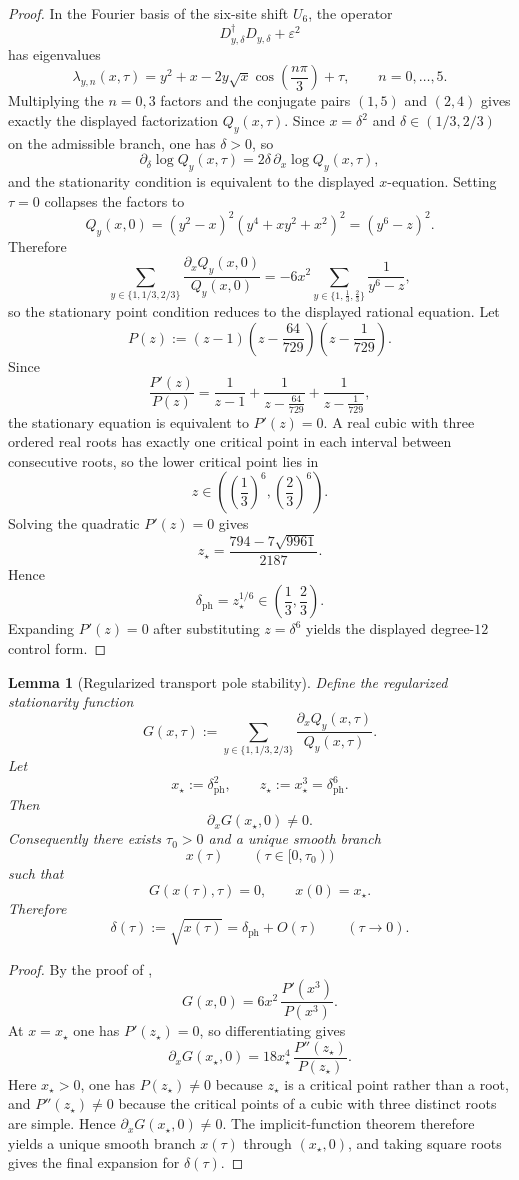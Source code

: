 \documentclass[11pt,a4paper]{article}
\newtheorem{lemma}[theorem]{Lemma}
\theoremstyle{definition}
\theoremstyle{remark}
\begin{document}
\begin{proof}
In the Fourier basis of the six-site shift $U_6$, the operator
\[
D_{y,\delta}^\dagger D_{y,\delta}+\varepsilon^2
\]
has eigenvalues
\[
\lambda_{y,n}(x,\tau)
=
y^2+x-2y\sqrt{x}\cos\!\left(\frac{n\pi}{3}\right)+\tau,
\qquad n=0,\dots,5.
\]
Multiplying the $n=0,3$ factors and the conjugate pairs $(1,5)$ and $(2,4)$ gives exactly the
displayed factorization $Q_y(x,\tau)$. Since $x=\delta^2$ and $\delta\in(1/3,2/3)$ on the
admissible branch, one has $\delta>0$, so
\[
\partial_\delta\log Q_y(x,\tau)
=
2\delta\,\partial_x\log Q_y(x,\tau),
\]
and the stationarity condition is equivalent to the displayed $x$-equation. Setting $\tau=0$
collapses the factors to
\[
Q_y(x,0)
=(y^2-x)^2(y^4+xy^2+x^2)^2
=(y^6-z)^2.
\]
Therefore
\[
\sum_{y\in\{1,1/3,2/3\}}\frac{\partial_x Q_y(x,0)}{Q_y(x,0)}
=
-6x^2\sum_{y\in\{1,\frac13,\frac23\}}\frac{1}{y^6-z},
\]
so the stationary point condition reduces to the displayed rational equation. Let
\[
P(z):=(z-1)\left(z-\frac{64}{729}\right)\left(z-\frac{1}{729}\right).
\]
Since
\[
\frac{P'(z)}{P(z)}
=
\frac{1}{z-1}
+
\frac{1}{z-\frac{64}{729}}
+
\frac{1}{z-\frac{1}{729}},
\]
the stationary equation is equivalent to $P'(z)=0$. A real cubic with three ordered real roots has
exactly one critical point in each interval between consecutive roots, so the lower critical point
lies in
\[
z\in\left(\left(\frac13\right)^6,\left(\frac23\right)^6\right).
\]
Solving the quadratic $P'(z)=0$ gives
\[
z_\star=\frac{794-7\sqrt{9961}}{2187}.
\]
Hence
\[
\delta_{\mathrm{ph}}=z_\star^{1/6}\in\left(\frac13,\frac23\right).
\]
Expanding $P'(z)=0$ after substituting $z=\delta^6$ yields the displayed degree-$12$ control form.
\end{proof}

\begin{lemma}[Regularized transport pole stability]
\label{lem:regularized-transport-pole-stability}
Define the regularized stationarity function
\[
G(x,\tau):=
\sum_{y\in\{1,1/3,2/3\}}
\frac{\partial_x Q_y(x,\tau)}{Q_y(x,\tau)}.
\]
Let
\[
x_\star:=\delta_{\mathrm{ph}}^2,
\qquad
z_\star:=x_\star^3=\delta_{\mathrm{ph}}^6.
\]
Then
\[
\partial_xG(x_\star,0)\neq 0.
\]
Consequently there exists $\tau_0>0$ and a unique smooth branch
\[
x(\tau)\qquad (\tau\in[0,\tau_0))
\]
such that
\[
G(x(\tau),\tau)=0,
\qquad
x(0)=x_\star.
\]
Therefore
\[
\delta(\tau):=\sqrt{x(\tau)}=\delta_{\mathrm{ph}}+O(\tau)
\qquad (\tau\to 0).
\]
\end{lemma}

\begin{proof}
By the proof of ,
\[
G(x,0)=6x^2\,\frac{P'(x^3)}{P(x^3)}.
\]
At $x=x_\star$ one has $P'(z_\star)=0$, so differentiating gives
\[
\partial_xG(x_\star,0)
=
18x_\star^4\,\frac{P''(z_\star)}{P(z_\star)}.
\]
Here $x_\star>0$, one has $P(z_\star)\neq 0$ because $z_\star$ is a critical point rather than a
root, and $P''(z_\star)\neq 0$ because the critical points of a cubic with three distinct roots are
simple. Hence $\partial_xG(x_\star,0)\neq 0$. The implicit-function theorem therefore yields a
unique smooth branch $x(\tau)$ through $(x_\star,0)$, and taking square roots gives the final
expansion for $\delta(\tau)$.
\end{proof}
\end{document}
